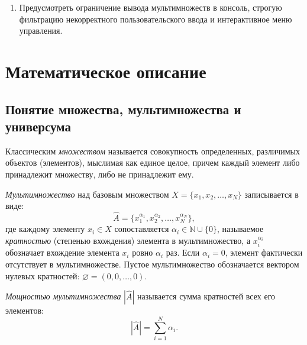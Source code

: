 \documentclass[14pt, a4paper]{extarticle}
\begin{document}
\begin{enumerate}[label=\arabic*.]
\begin{itemize}
			\item теоретико-множественная разность ($A \setminus B$);
			\item симметрическая разность ($A \triangle B$);
			\item дополнение ($\overline{A} = U \setminus A$);
			\item арифметическая сумма ($A + B$);
			\item арифметическая разность ($A - B$);
			\item арифметическое произведение ($A \cdot B$);
			\item арифметическое деление ($A : B$).
		\end{itemize}
		\item Предусмотреть ограничение вывода мультимножеств в консоль, строгую фильтрацию некорректного пользовательского ввода и интерактивное меню управления.
	\end{enumerate}
	
	\newpage
	\newpage
	\section{Математическое описание}
	
	\subsection{Понятие множества, мультимножества и универсума}
	
	Классическим \textit{множеством} называется совокупность определенных, различимых объектов (элементов), мыслимая как единое целое, причем каждый элемент либо принадлежит множеству, либо не принадлежит ему.
	
	\textit{Мультимножество} над базовым множеством $X = \{x_1, x_2, \dots, x_N\}$ записывается в виде:
	\begin{equation}
		\hat{A} = \{x_1^{\alpha_1}, x_2^{\alpha_2}, \dots, x_N^{\alpha_N}\},
	\end{equation}
	где каждому элементу $x_i \in X$ сопоставляется $\alpha_i \in \mathbb{N} \cup \{0\}$, называемое \textit{кратностью} (степенью вхождения) элемента в мультимножество, а $x_i^{\alpha_i}$ обозначает вхождение элемента $x_i$ ровно $\alpha_i$ раз. Если $\alpha_i = 0$, элемент фактически отсутствует в мультимножестве. Пустое мультимножество обозначается вектором нулевых кратностей: $\varnothing = (0, 0, \dots, 0)$.
	
	\textit{Мощностью мультимножества} $|\hat{A}|$ называется сумма кратностей всех его элементов:
	\begin{equation}
		|\hat{A}| = \sum_{i=1}^{N} \alpha_i.
	\end{equation}
	
\end{document}
